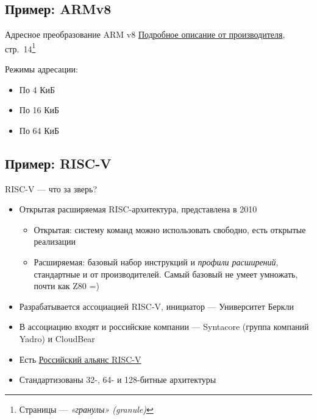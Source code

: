 \documentclass[xetex,aspectratio=43]{beamer}
\begin{document}
\subsection{Пример: ARMv8}

\begin{frame}{Адресное преобразование ARM v8}
    \href{https://documentation-service.arm.com/static/5efa1d23dbdee951c1ccdec5}{Подробное описание от производителя}, стр.~14\footnote{Страницы --- \emph{«гранулы» (granule)}}

    Режимы адресации:
    \begin{itemize}
        \item По 4 КиБ
        \item По 16 КиБ
        \item По 64 КиБ
    \end{itemize}
\end{frame}

\subsection{Пример: RISC-V}

\begin{frame}{RISC-V --- что за зверь?}
    \begin{itemize}
        \item Открытая расширяемая RISC-архитектура, представлена в 2010
        \begin{itemize}
            \item Открытая: систему команд можно использовать свободно, есть открытые реализации
            \item Расширяемая: базовый набор инструкций и \emph{профили расширений}, стандартные и от производителей. Самый базовый не умеет умножать, почти как Z80 =)
        \end{itemize}
        \item Разрабатывается ассоциацией RISC-V, инициатор --- Университет Беркли
        \item В ассоциацию входят и российские компании --- Syntacore (группа компаний Yadro) и CloudBear
        \item Есть \href{https://riscv-alliance.ru/}{Российский альянс RISC-V}
        \item Стандартизованы 32-, 64- и 128-битные архитектуры
    \end{itemize}
\end{frame}
\end{document}
